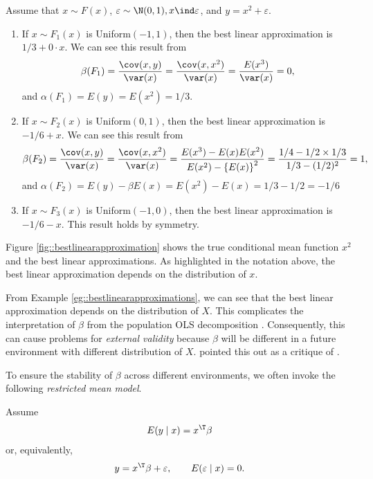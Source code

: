 \begin{example}\label{eg::bestlinearapproximations}
Assume that $x\sim F(x)$, $\varepsilon\sim\N(0,1),x\ind\varepsilon$,
and $y=x^{2}+\varepsilon$.
\begin{enumerate}
\item
If $x\sim F_{1}(x)$ is Uniform$(-1,1)$, then the best linear
approximation is $1/3+0\cdot x$. We can see this result from
$$
\beta(F_{1})=\frac{\text{\cov}(x,y)}{\var(x)}=\frac{\cov(x,x^{2})}{\var(x)}=\frac{E(x^{3})}{\var(x)}=0,
$$
and $\alpha(F_{1})=E(y)=E(x^{2}) =1/3$. 

\item
If $x\sim F_{2}(x)$ is Uniform$(0,1)$, then the best linear approximation is $-1/6+x$. We can see this result from 
$$
\beta(F_{2})=\frac{\cov(x,y)}{\var(x)}=\frac{\cov(x,x^{2})}{\var(x)}=\frac{E(x^{3})-E(x)E(x^{2})}{E(x^{2})-\left\{ E(x)\right\} ^{2}}=\frac{1/4-1/2\times1/3}{1/3-(1/2)^{2}}=1,
$$
and $\alpha(F_{2})=E(y)-\beta E(x)=E(x^{2})-E(x)=1/3-1/2=-1/6$

\item 
If $x\sim F_{3}(x)$ is Uniform$(-1,0)$, then the best linear approximation is $-1/6-x.$ This result holds by symmetry. 
\end{enumerate}
Figure \ref{fig::bestlinearapproximation} shows the true conditional mean function $x^2$ and the best linear approximations. As highlighted in the notation above, the best linear approximation
depends on the distribution of $x$.
\end{example}

 


 

From Example \ref{eg::bestlinearapproximations}, we can see that the best linear approximation depends on the distribution of $X$. This complicates the interpretation of $\beta$ from the population OLS decomposition \citep{buja2019models}. Consequently, this can cause problems for {\it external validity} because $\beta$ will be different in a future environment with different distribution of $X$. \citet[][page 66]{sims2010but} pointed this out as a critique of \citet{angrist2008mostly}.



To ensure the stability of $\beta$ across different environments, we often invoke the following {\it restricted mean model}.

\begin{assumption}
\label{assume::model-restricted}
Assume \begin{eqnarray}
E(y\mid x)=x^{\T}\beta
\label{eq::restricted-mean-model}
\end{eqnarray}
or, equivalently, 
\[
y=x^{\T}\beta+\varepsilon,\qquad E(\varepsilon\mid x)=0.
\]
\end{assumption}

